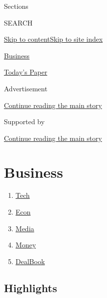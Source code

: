 Sections

SEARCH

\protect\hyperlink{site-content}{Skip to
content}\protect\hyperlink{site-index}{Skip to site index}

\href{https://www.nytimes3xbfgragh.onion/section/business}{Business}

\href{https://myaccount.nytimes3xbfgragh.onion/auth/login?response_type=cookie\&client_id=vi}{}

\href{https://www.nytimes3xbfgragh.onion/section/todayspaper}{Today's
Paper}

Advertisement

\protect\hyperlink{after-top}{Continue reading the main story}

Supported by

\protect\hyperlink{after-sponsor}{Continue reading the main story}

\hypertarget{business}{%
\section{Business}\label{business}}

\begin{enumerate}
\def\labelenumi{\arabic{enumi}.}
\tightlist
\item
  \href{/section/technology}{Tech}
\item
  \href{/section/business/economy}{Econ}
\item
  \href{/section/business/media}{Media}
\item
  \href{/section/your-money}{Money}
\item
  \href{/section/business/dealbook}{DealBook}
\end{enumerate}

\hypertarget{highlights}{%
\subsection{Highlights}\label{highlights}}

